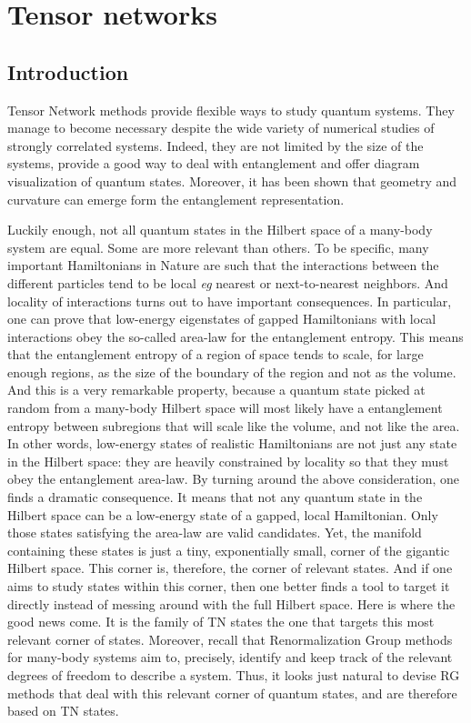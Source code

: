 \chapter{Tensor networks}

	\section{Introduction}

		Tensor Network methods provide flexible ways to study quantum systems. They manage to become necessary despite the wide variety of numerical studies of strongly correlated systems. Indeed, they are not limited by the size of the systems, provide a good way to deal with entanglement and offer diagram visualization of quantum states. Moreover, it has been shown that geometry and curvature can emerge form the entanglement representation.

		Luckily enough, not all quantum states in the Hilbert space of a many-body system are equal. Some are more relevant than others. To be specific, many important Hamiltonians in Nature are such that the interactions between the different particles tend to be local \emph{eg} nearest or next-to-nearest neighbors. And locality of interactions turns out to have important consequences. In particular, one can prove that low-energy eigenstates of gapped Hamiltonians with local interactions obey the so-called area-law for the entanglement entropy. This means that the entanglement entropy of a region of space tends to scale, for large enough regions, as the size of the boundary of the region and not as the volume. And this is a very remarkable property, because a quantum state picked at random from a many-body Hilbert space will most likely have a entanglement entropy between
		subregions that will scale like the volume, and not like the area. In other words, low-energy states of realistic Hamiltonians are not just any state in the Hilbert space: they are heavily constrained by locality so that they must obey the entanglement area-law. By turning around the above consideration, one finds a dramatic consequence. It means that not any quantum state in the Hilbert space can be a low-energy state of a gapped, local Hamiltonian. Only those states satisfying the area-law are valid candidates. Yet, the manifold containing these states is just a tiny, exponentially small, corner of the gigantic Hilbert space. This corner is,	therefore, the corner of relevant states. And if one aims to study states within this corner, then one better finds a tool to target it directly instead of messing around with the full Hilbert space. Here is where the good news come. It is the family of TN states the one that targets this most relevant corner of states. Moreover, recall that Renormalization Group methods for many-body systems aim	to, precisely, identify and keep track of the relevant degrees of freedom to describe a system. Thus, it looks just natural to devise RG methods that deal with this relevant corner of quantum states, and are	therefore based on TN states.\\

